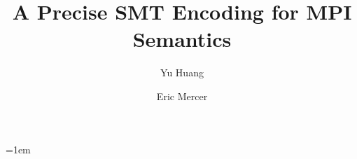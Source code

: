 \documentclass[conference]{llncs}
\begin{document}
\title{A Precise SMT Encoding for MPI Semantics}

\author{Yu Huang \and Eric Mercer}

\maketitle
%
%
\emergencystretch=1em

\begin{abstract} 

\end{abstract}





%






\end{document}
